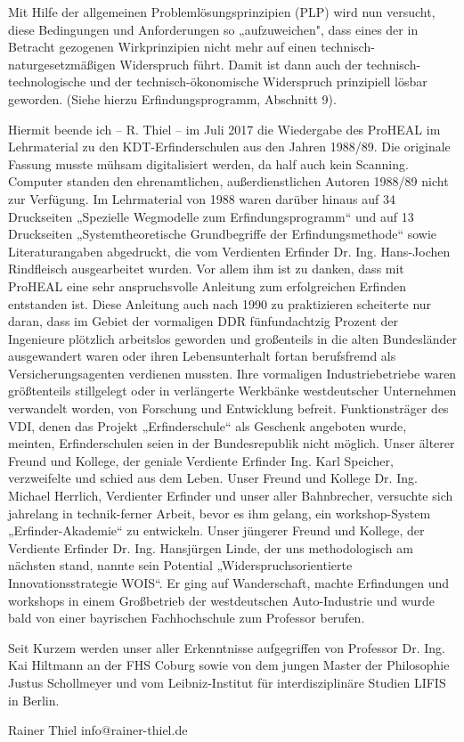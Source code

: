 \documentclass[12pt,a4paper]{article}
\begin{document}
Mit Hilfe der allgemeinen Problemlösungsprinzipien (PLP) wird nun versucht, diese Bedingungen und Anforderungen so „aufzuweichen", dass eines der in Betracht gezogenen Wirkprinzipien nicht mehr auf einen technisch-naturgesetzmäßigen Widerspruch führt. Damit ist dann auch der technisch-technologische und der technisch-ökonomische Widerspruch prinzipiell lösbar geworden. (Siehe hierzu Erfindungsprogramm, Abschnitt 9).

Hiermit beende ich – R. Thiel – im Juli 2017 die Wiedergabe des ProHEAL im Lehrmaterial zu den KDT-Erfinderschulen aus den Jahren 1988/89. Die originale Fassung musste mühsam digitalisiert werden, da half auch kein Scanning. Computer standen den ehrenamtlichen, außerdienstlichen Autoren 1988/89 nicht zur Verfügung. Im Lehrmaterial von 1988 waren darüber hinaus auf 34 Druckseiten „Spezielle Wegmodelle zum Erfindungsprogramm“ und auf 13 Druckseiten „Systemtheoretische Grundbegriffe der Erfindungsmethode“ sowie Literaturangaben abgedruckt, die vom Verdienten Erfinder Dr. Ing. Hans-Jochen Rindfleisch ausgearbeitet wurden. Vor allem ihm ist zu danken, dass mit ProHEAL eine sehr anspruchsvolle Anleitung zum erfolgreichen Erfinden entstanden ist. Diese Anleitung auch nach 1990 zu praktizieren scheiterte nur daran, dass im Gebiet der vormaligen DDR fünfundachtzig Prozent der Ingenieure plötzlich arbeitslos geworden und großenteils in die alten Bundesländer ausgewandert waren oder ihren Lebensunterhalt fortan berufsfremd als Versicherungsagenten verdienen mussten. Ihre vormaligen Industriebetriebe waren größtenteils stillgelegt oder in verlängerte Werkbänke westdeutscher Unternehmen verwandelt worden, von Forschung und Entwicklung befreit. Funktionsträger des VDI, denen das Projekt „Erfinderschule“ als Geschenk angeboten wurde, meinten, Erfinderschulen seien in der Bundesrepublik nicht möglich. Unser älterer Freund und Kollege, der geniale Verdiente Erfinder Ing. Karl Speicher, verzweifelte und schied aus dem Leben. Unser Freund und Kollege Dr. Ing. Michael Herrlich, Verdienter Erfinder und unser aller Bahnbrecher, versuchte sich jahrelang in technik-ferner Arbeit, bevor es ihm gelang, ein workshop-System „Erfinder-Akademie“ zu entwickeln. Unser jüngerer Freund und Kollege, der Verdiente Erfinder Dr. Ing. Hansjürgen Linde, der uns methodologisch am nächsten stand, nannte sein Potential „Widerspruchsorientierte Innovationsstrategie WOIS“. Er ging auf Wanderschaft, machte Erfindungen und workshops in einem Großbetrieb der westdeutschen Auto-Industrie und wurde bald von einer bayrischen Fachhochschule zum Professor berufen.

Seit Kurzem werden unser aller Erkenntnisse aufgegriffen von Professor Dr. Ing. Kai Hiltmann an der FHS Coburg sowie von dem jungen Master der Philosophie Justus Schollmeyer und vom Leibniz-Institut für interdisziplinäre Studien LIFIS in Berlin.

Rainer Thiel       info@rainer-thiel.de
\end{document}
